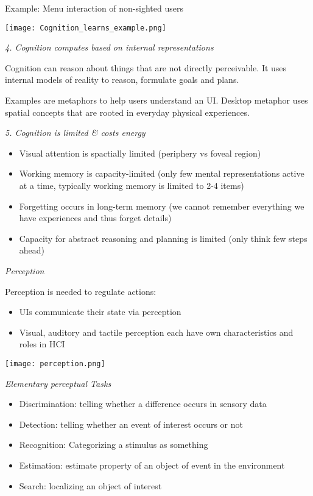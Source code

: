 Example: Menu interaction of non-sighted users
\begin{center}
	\texttt{[image: Cognition\_learns\_example.png]}
\end{center}

\medskip

\textit{4. Cognition computes based on internal representations} \smallskip

 Cognition can reason about things that are not directly perceivable. It uses internal models of reality to reason, formulate goals and plans.

 Examples are metaphors to help users understand an UI. Desktop metaphor uses spatial concepts that are rooted in everyday physical experiences. 

\textit{5. Cognition is limited \& costs energy} \smallskip

\begin{itemize}[itemsep=-5pt, topsep=0pt, leftmargin=*]
	\item Visual attention is spactially limited (periphery vs foveal region)
	\item Working memory is capacity-limited (only few mental representations active at a time, typically working memory is limited to 2-4 items)
	\item Forgetting occurs in long-term memory (we cannot remember everything we have experiences and thus forget details)
	\item Capacity for abstract reasoning and planning is limited (only think few steps ahead)
\end{itemize}


\textit{Perception} \smallskip

Perception is needed to regulate actions:
\begin{itemize}[itemsep=-5pt, topsep=0pt, leftmargin=*]
	\item UIs communicate their state via perception
	\item Visual, auditory and tactile perception each have own characteristics and roles in HCI
\end{itemize}

\begin{center}
	\texttt{[image: perception.png]}
\end{center}


\textit{Elementary perceptual Tasks} \smallskip

\begin{itemize}[itemsep=-5pt, topsep=0pt, leftmargin=*]
	\item Discrimination: telling whether a difference occurs in sensory data
	\item Detection: telling whether an event of interest occurs or not
	\item Recognition: Categorizing a stimulus as something
	\item Estimation: estimate property of an object of event in the environment
	\item Search: localizing an object of interest
\end{itemize}

